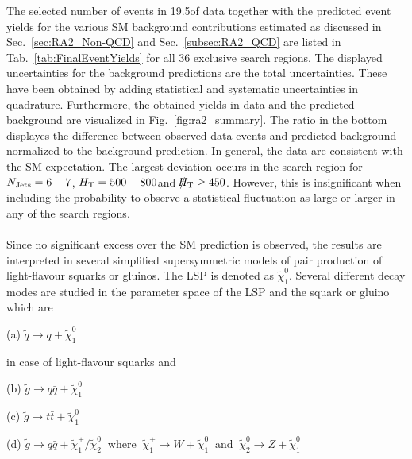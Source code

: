 \begin{table}[!hp]
{\begin{tabular}{lll|r|r|r|r|r|r}
    \end{tabular}}
\end{table}

The selected number of events in 19.5\fbinv of data together with the predicted event yields for the various SM background contributions estimated as discussed in Sec.~\ref{sec:RA2_Non-QCD} and Sec.~\ref{subsec:RA2_QCD} are listed in Tab.~\ref{tab:FinalEventYields} for all 36 exclusive search regions. The displayed uncertainties for the background predictions are the total uncertainties. These have been obtained by adding statistical and systematic uncertainties in quadrature. Furthermore, the obtained yields in data and the predicted background are visualized in Fig.~\ref{fig:ra2_summary}. The ratio in the bottom displayes the difference between observed data events and predicted background normalized to the background prediction. In general, the data are consistent with the SM expectation. The largest deviation occurs in the search region for $N_{\text{Jets}} = 6-7$, $H_{\text{T}} = 500-800$\gev and $\slash\mkern-12mu{H}_{\text{T}} \ge 450$\gev. However, this is insignificant when including the probability to observe a statistical fluctuation as large or larger in any of the search regions. \\
\\
Since no significant excess over the SM prediction is observed, the results are interpreted in several simplified supersymmetric models of pair production of light-flavour squarks or gluinos. The LSP is denoted as $\tilde{\chi}_1^0$. Several different decay modes are studied in the parameter space of the LSP and the squark or gluino which are
\begin{description}
\item (a) $\tilde{q} \rightarrow q + \tilde{\chi}_1^0$
\end{description} 
in case of light-flavour squarks and
\begin{description}
\item (b) $\tilde{g} \rightarrow q\bar{q} + \tilde{\chi}_1^0$
\item (c) $\tilde{g} \rightarrow t\bar{t} + \tilde{\chi}_1^0$
\item (d) $\tilde{g} \rightarrow q\bar{q} + \tilde{\chi}_1^{\pm}/\tilde{\chi}_2^0 \;\; \mathrm{where} \;\; \tilde{\chi}_1^{\pm} \rightarrow W + \tilde{\chi}_1^0 \;\; \mathrm{and} \;\; \tilde{\chi}_2^0 \rightarrow Z + \tilde{\chi}_1^0$
\end{description}  
